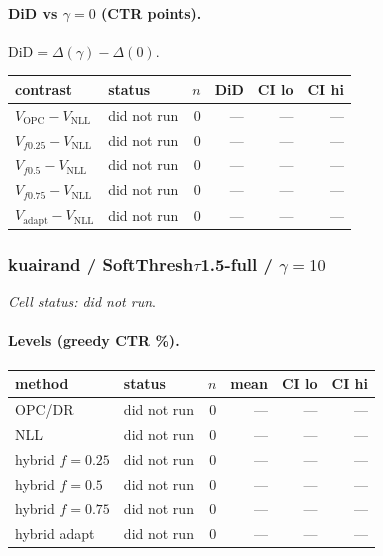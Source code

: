 \documentclass[10pt,a4paper]{article}
\begin{document}
\paragraph{DiD vs $\gamma=0$ (CTR points).} $\mathrm{DiD}=\Delta(\gamma)-\Delta(0)$.
{\centering\small\begin{tabular}{llrrrr}
\toprule contrast & status & $n$ & DiD & CI lo & CI hi \\
\midrule
$V_{\mathrm{OPC}}-V_{\mathrm{NLL}}$ & did not run & 0 & --- & --- & --- \\
$V_{f0.25}-V_{\mathrm{NLL}}$ & did not run & 0 & --- & --- & --- \\
$V_{f0.5}-V_{\mathrm{NLL}}$ & did not run & 0 & --- & --- & --- \\
$V_{f0.75}-V_{\mathrm{NLL}}$ & did not run & 0 & --- & --- & --- \\
$V_{\mathrm{adapt}}-V_{\mathrm{NLL}}$ & did not run & 0 & --- & --- & --- \\
\bottomrule\end{tabular}\par}
\bigskip
\subsubsection{kuairand / SoftThresh$\tau$1.5-full / $\gamma=10$}
\emph{Cell status: did not run}.
\paragraph{Levels (greedy CTR \%).}
{\centering\small\begin{tabular}{llrrrr}
\toprule method & status & $n$ & mean & CI lo & CI hi \\
\midrule
OPC/DR & did not run & 0 & --- & --- & --- \\
NLL & did not run & 0 & --- & --- & --- \\
hybrid $f{=}0.25$ & did not run & 0 & --- & --- & --- \\
hybrid $f{=}0.5$ & did not run & 0 & --- & --- & --- \\
hybrid $f{=}0.75$ & did not run & 0 & --- & --- & --- \\
hybrid adapt & did not run & 0 & --- & --- & --- \\
\bottomrule\end{tabular}\par}
\end{document}
